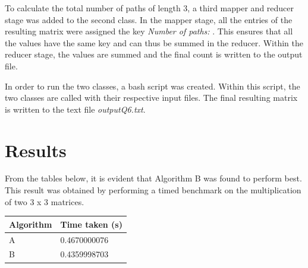 \documentclass[10pt,twocolumn]{witseiepaper}
\begin{document}
To calculate the total number of paths of length 3, a third mapper and reducer stage was added to the second class. In the mapper stage, all the entries of the resulting matrix were assigned the key \textit{Number of paths: }. This ensures that all the values have the same key and can thus be summed in the reducer. Within the reducer stage, the values are summed and the final count is written to the output file.

In order to run the two classes, a bash script was created. Within this script, the two classes are called with their respective input files. The final resulting matrix is written to the text file \textit{outputQ6.txt}. 

\section{Results}

From the tables below, it is evident that Algorithm B was found to perform best. This result was obtained by performing a timed benchmark on the multiplication of two 3 x 3 matrices.


\begin{tabular}{|l|l|}
	\hline 
	\textbf{Algorithm} & \textbf{Time taken (s)} \\ 
	\hline 
	 A & 0.4670000076 \\ 
	\hline 
	 B & 0.4359998703 \\ 
	\hline 
\end{tabular} 





\end{document}
